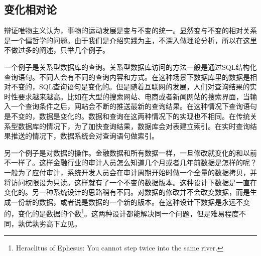\subsection{变化相对论}

辩证唯物主义认为，事物的运动发展是变与不变的统一。显然变与不变的相对关系是一个偏哲学的问题。由于我们是介绍实践为主，不深入做理论分析，所以在这里不做过多的阐述，只举几个例子。

一个例子是关系型数据库的查询。关系型数据库访问的方法一般是通过SQL结构化查询语句。不同人会有不同的查询内容和方式。在这种场景下数据库里的数据是相对不变的，SQL查询语句是变化的。但是随着互联网的发展，人们对查询结果的实时性要求越来越高。比如在大型的搜索网站、电商或者新闻网站的搜索界面，当输入一个查询条件之后，网站会不断的推送最新的查询结果。在这种情况下查询语句是不变的，数据是变化的。数据和查询在这两种情况下的实现也不相同。在传统关系型数据库的情况下，为了加快查询结果，数据库会对表建立索引。在实时查询结果推送的情况下，数据系统会对查询语句做索引。


另一个例子是对数据的操作。金融数据和所有数据一样，一旦修改就变化的和以前不一样了。这样金融行业的审计人员怎么知道几个月或者几年前数据是怎样的呢？一般为了应付审计，系统开发人员会在审计周期开始时做一个全量的数据拷贝，并将访问权限设为只读。这样就有了一个不变的数据版本。这种设计下数据是一直在变化的。另一种系统设计的思路稍有不同。对数据的修改并不会改变数据，而是生成一份新的数据，或者说是数据的一个新的版本。在这种设计下数据是永远不变的，变化的是数据的个数\footnote{Heraclitus of Ephesus: You cannot step twice into the same river.}。这两种设计都能解决同一个问题，但是难易程度不同，孰优孰劣高下立见。










